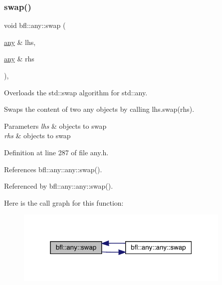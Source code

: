 \subsubsection{\texorpdfstring{swap()}{swap()}}
{\footnotesize\ttfamily void bfl\+::any\+::swap (\begin{DoxyParamCaption}\item[{\mbox{\hyperlink{classbfl_1_1any_1_1any}{any}} \&}]{lhs,  }\item[{\mbox{\hyperlink{classbfl_1_1any_1_1any}{any}} \&}]{rhs }\end{DoxyParamCaption})\hspace{0.3cm}{\ttfamily [inline]}, {\ttfamily [noexcept]}}



Overloads the std\+::swap algorithm for std\+::any. 

Swaps the content of two any objects by calling lhs.\+swap(rhs).


\begin{DoxyParams}{Parameters}
{\em lhs} & objects to swap \\
\hline
{\em rhs} & objects to swap \\
\hline
\end{DoxyParams}


Definition at line 287 of file any.\+h.



References bfl\+::any\+::any\+::swap().



Referenced by bfl\+::any\+::any\+::swap().

Here is the call graph for this function\+:
\nopagebreak
\begin{figure}[H]
\begin{center}
\leavevmode
\includegraphics[width=292pt]{namespacebfl_1_1any_adb1328ea975e3bf9c0addc1689215bad_cgraph}
\end{center}
\end{figure}

